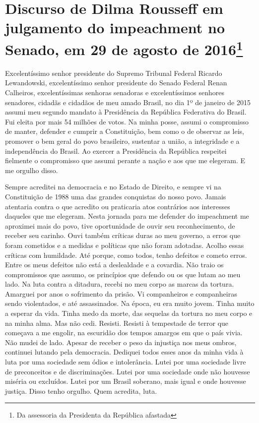 \chapter*{Discurso de Dilma Rousseff em julgamento do impeachment no Senado, em 29
de agosto de 2016\footnote{Da assessoria da Presidenta da República afastada}}


Excelentíssimo senhor presidente do Supremo Tribunal Federal Ricardo
Lewandowski, excelentíssimo senhor presidente do Senado Federal Renan
Calheiros, excelentíssimas senhoras senadoras e excelentíssimos senhores
senadores, cidadãs e cidadãos de meu amado Brasil, no dia 1º de janeiro
de 2015 assumi meu segundo mandato à Presidência da República Federativa
do Brasil. Fui eleita por mais 54 milhões de votos. Na minha posse,
assumi o compromisso de manter, defender e cumprir a Constituição, bem
como o de observar as leis, promover o bem geral do povo brasileiro,
sustentar a união, a integridade e a independência do Brasil. Ao exercer
a Presidência da República respeitei fielmente o compromisso que assumi
perante a nação e aos que me elegeram. E me orgulho disso.

Sempre
acreditei na democracia e no Estado de Direito, e sempre vi na
Constituição de 1988 uma das grandes conquistas do nosso povo. Jamais
atentaria contra o que acredito ou praticaria atos contrários aos
interesses daqueles que me elegeram. Nesta jornada para me defender do
impeachment me aproximei mais do povo, tive oportunidade de ouvir
seu reconhecimento, de receber seu carinho. Ouvi também críticas duras
ao meu governo, a erros que foram cometidos e a medidas e políticas que
não foram adotadas. Acolho essas críticas com humildade. Até porque,
como todos, tenho defeitos e cometo erros. Entre os meus defeitos não
está a deslealdade e a covardia. Não traio os compromissos que assumo,
os princípios que defendo ou os que lutam ao meu lado. Na luta contra a
ditadura, recebi no meu corpo as marcas da tortura. Amarguei por anos o
sofrimento da prisão. Vi companheiros e companheiras sendo violentados,
e até assassinados. Na época, eu era muito jovem. Tinha muito a esperar
da vida. Tinha medo da morte, das sequelas da tortura no meu corpo e na
minha alma. Mas não cedi. Resisti. Resisti à tempestade de terror que
começava a me engolir, na escuridão dos tempos amargos em que o país
vivia. Não mudei de lado. Apesar de receber o peso da injustiça nos meus
ombros, continuei lutando pela democracia. Dediquei todos esses anos da
minha vida à luta por uma sociedade sem ódios e intolerância. Lutei por
uma sociedade livre de preconceitos e de discriminações. Lutei por uma
sociedade onde não houvesse miséria ou excluídos. Lutei por um Brasil
soberano, mais igual e onde houvesse justiça. Disso tenho orgulho. Quem
acredita, luta.

